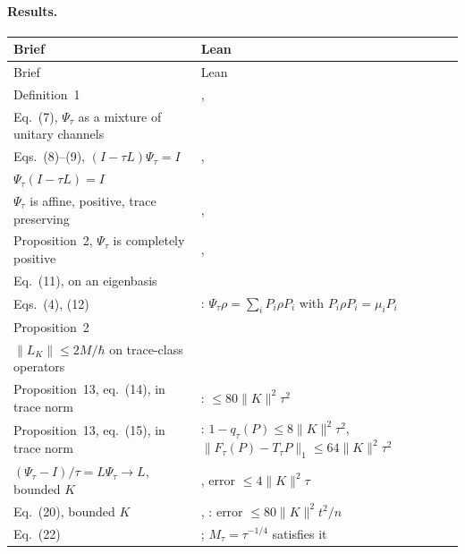 \documentclass[11pt]{article}
\begin{document}
\paragraph{Results.}
\begin{xltabular}{\textwidth}{@{}BL@{}}
\toprule
Brief & Lean \\
\midrule
\endfirsthead
\toprule
Brief & Lean \\
\midrule
\endhead
Definition~1 & ,  \\
Eq.~(7), $\Psi_\tau$ as a mixture of unitary channels &  \\
Eqs.~(8)--(9), $(I - \tau L)\Psi_\tau = I$ & ,
   \\
$\Psi_\tau(I - \tau L) = I$ &  \\
$\Psi_\tau$ is affine, positive, trace preserving & ,
   \\
Proposition~2, $\Psi_\tau$ is completely positive & ,
   \\
Eq.~(11), on an eigenbasis &  \\
Eqs.~(4), (12) & : $\Psi_\tau\rho = \sum_i
  P_i\rho P_i$ with $P_i\rho P_i = \mu_iP_i$ \\
Proposition~2 &  \\
$\|L_K\| \le 2M/\hbar$ on trace-class operators &  \\
Proposition~13, eq.~(14), in trace norm &
  : $\le 80\|K\|^2\tau^2$ \\
Proposition~13, eq.~(15), in trace norm & :
  $1 - q_\tau(P) \le 8\|K\|^2\tau^2$, $\|F_\tau(P) - T_\tau P\|_1 \le 64\|K\|^2\tau^2$ \\
$(\Psi_\tau - I)/\tau = L\Psi_\tau \to L$, bounded $K$ &
  , error $\le 4\|K\|^2\tau$ \\
Eq.~(20), bounded $K$ & ,
  : error $\le 80\|K\|^2t^2/n$ \\
Eq.~(22) & ; $M_\tau = \tau^{-1/4}$ satisfies it

\end{xltabular}
\end{document}
